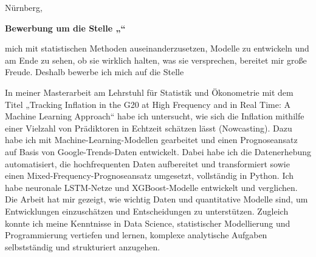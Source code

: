 









\vspace{18pt}


\begin{flushright}
Nürnberg, 
\end{flushright}

\vspace{10pt}


{\color{accent}\textbf{Bewerbung um die Stelle „\position{}“}}

\vspace{4pt}




mich mit statistischen Methoden auseinanderzusetzen, Modelle zu entwickeln und am Ende zu sehen, ob sie wirklich halten, was sie versprechen, bereitet mir große Freude. Deshalb bewerbe ich mich auf die Stelle 

In meiner Masterarbeit am Lehrstuhl für Statistik und Ökonometrie mit dem Titel „Tracking Inflation in the G20 at High Frequency and in Real Time: A Machine Learning Approach“ habe ich untersucht, wie sich die Inflation mithilfe einer Vielzahl von Prädiktoren in Echtzeit schätzen lässt (Nowcasting). Dazu habe ich mit Machine-Learning-Modellen gearbeitet und einen Prognoseansatz auf Basis von Google-Trends-Daten entwickelt. Dabei habe ich die Datenerhebung automatisiert, die hochfrequenten Daten aufbereitet und transformiert sowie einen Mixed-Frequency-Prognoseansatz umgesetzt, vollständig in Python. Ich habe neuronale LSTM-Netze und XGBoost-Modelle entwickelt und verglichen. Die Arbeit hat mir gezeigt, wie wichtig Daten und quantitative Modelle sind, um Entwicklungen einzuschätzen und Entscheidungen zu unterstützen. Zugleich konnte ich meine Kenntnisse in Data Science, statistischer Modellierung und Programmierung vertiefen und lernen, komplexe analytische Aufgaben selbstständig und strukturiert anzugehen.

